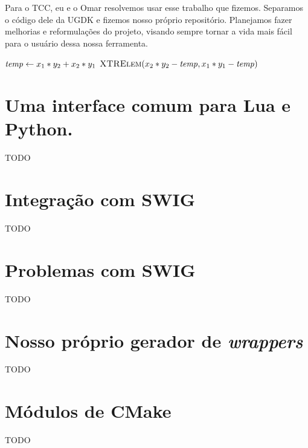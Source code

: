 Para o TCC, eu e o Omar resolvemos usar esse trabalho que fizemos. Separamos o
código dele da UGDK e fizemos nosso próprio repositório. Planejamos fazer
melhorias e reformulações do projeto, visando sempre tornar a vida mais fácil
para o usuário dessa nossa ferramenta.


\begin{codebox}
    \zi $\id{temp} \gets x_1 * y_2 + x_2 * y_1$
    \zi \Return $\proc{XTRElem}(x_2 * y_2 - \id{temp}, x_1 * y_1 -
    \id{temp})$
\end{codebox}

\section{Uma interface comum para Lua e Python.}
\label{sec:atividades:opa}

TODO

\section{Integração com SWIG}

TODO

\section{Problemas com SWIG}

TODO

\section{Nosso próprio gerador de \emph{wrappers}}

TODO

\section{Módulos de CMake}

TODO

